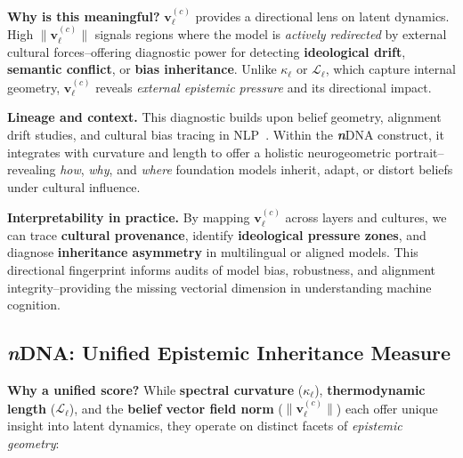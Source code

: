 \noindent
\textbf{Why is this meaningful?}  
$\mathbf{v}_\ell^{(c)}$ provides a directional lens on latent dynamics. High $\| \mathbf{v}_\ell^{(c)} \|$ signals regions where the model is \emph{actively redirected} by external cultural forces--offering diagnostic power for detecting \textbf{ideological drift}, \textbf{semantic conflict}, or \textbf{bias inheritance}. Unlike $\kappa_\ell$ or $\mathcal{L}_\ell$, which capture internal geometry, $\mathbf{v}_\ell^{(c)}$ reveals \emph{external epistemic pressure} and its directional impact.

\vspace{0.3em}

\noindent
\textbf{Lineage and context.}  
This diagnostic builds upon belief geometry, alignment drift studies, and cultural bias tracing in NLP~\citep{wang2023culturalbias, zhou2023alignmentdrift, shen2023beliefgeometry, arora2023stereoset, bommasani2023foundation, peng2024cultural, laurens2024anthropic, kang2024biasfairness, de2023latentbias, gao2023value}. Within the \textbf{\textit{n}}\textnormal{DNA} construct, it integrates with curvature and length to offer a holistic neurogeometric portrait--revealing \emph{how}, \emph{why}, and \emph{where} foundation models inherit, adapt, or distort beliefs under cultural influence.

\vspace{0.3em}

\noindent
\textbf{Interpretability in practice.}  
By mapping $\mathbf{v}_\ell^{(c)}$ across layers and cultures, we can trace \textbf{cultural provenance}, identify \textbf{ideological pressure zones}, and diagnose \textbf{inheritance asymmetry} in multilingual or aligned models. This directional fingerprint informs audits of model bias, robustness, and alignment integrity--providing the missing vectorial dimension in understanding machine cognition.


\subsection{\textbf{\textit{n}}\textnormal{DNA}: Unified Epistemic Inheritance Measure}

\noindent
\textbf{Why a unified score?}  
While \textbf{spectral curvature} ($\kappa_\ell$), \textbf{thermodynamic length} ($\mathcal{L}_\ell$), and the \textbf{belief vector field norm} ($\| \mathbf{v}_\ell^{(c)} \|$) each offer unique insight into latent dynamics, they operate on distinct facets of \emph{epistemic geometry}:

